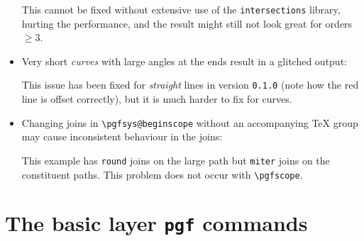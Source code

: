 \documentclass[12pt,a4paper]{article}
\makeatletter
\theoremstyle{definition}
\def\disablewarnings{\def\pgfutil@packagewarning##1##2{}}
\makeatother
\begin{document}
\begin{itemize}
\begin{tkzexample}[latex=3.5cm]
\end{tkzexample}
  This cannot be fixed without extensive use of the \texttt{intersections} library, hurting the performance, and the result might still not look great for orders $\geq 3$.
  \item Very short \emph{curves} with large angles at the ends result in a glitched output:\nopagebreak
\begin{tkzexample}[latex=3.75cm,pre=\disablewarnings]
\end{tkzexample}
  This issue has been fixed for \emph{straight} lines in version \texttt{0.1.0} (note how the red line is offset correctly), but it is much harder to fix for curves.
  \item Changing joins in \verb|\pgfsys@beginscope| without an accompanying \TeX{} group may cause inconsistent behaviour in the joins:
\begin{tkzexample}[latex=2cm]
\makeatletter
{}
\makeatother
\end{tkzexample}
  This example has \texttt{round} joins on the large path but \texttt{miter} joins on the constituent paths. This problem does not occur with \verb|\pgfscope|.
\end{itemize}


\section{The basic layer \texttt{pgf} commands}
\end{document}
